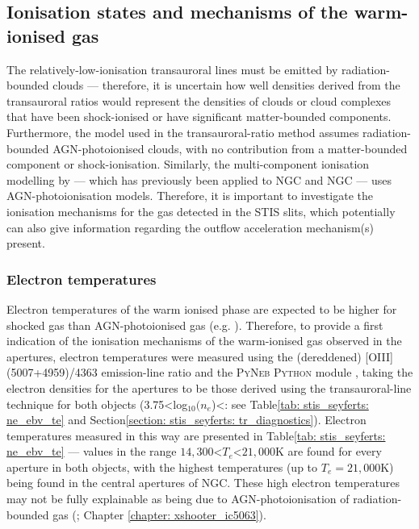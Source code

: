 \subsection{Ionisation states and mechanisms of the warm-ionised gas}
\label{section: stis_seyferts: mechanisms}

The relatively-low-ionisation transauroral lines must be emitted by radiation-bounded clouds --- therefore, it is uncertain how well densities derived from the transauroral ratios would represent the densities of clouds or cloud complexes that have been shock-ionised or have significant matter-bounded components. Furthermore, the model used in the transauroral-ratio method assumes radiation-bounded AGN-photoionised clouds, with no contribution from a matter-bounded component or shock-ionisation. Similarly, the multi-component ionisation modelling by \citet{Revalski2021} --- which has previously been applied to NGC and NGC --- uses AGN-photoionisation models. Therefore, it is important to investigate the ionisation mechanisms for the gas detected in the STIS slits, which potentially can also give information regarding the outflow acceleration mechanism(s) present.

\subsubsection{Electron temperatures}
\label{section: stis_seyferts: electron_temperatures}

Electron temperatures of the warm ionised phase are expected to be higher for shocked gas than AGN-photoionised gas (e.g. \citealt{Fosbury1978, VillarMartin1999}). Therefore, to provide a first indication of the ionisation mechanisms of the warm-ionised gas observed in the apertures, electron temperatures were measured using the (dereddened) [OIII](5007+4959)/4363 emission-line ratio and the \textsc{PyNeb Python} module \citep{Luridiana2015}, taking the electron densities for the apertures to be those derived using the transauroral-line technique for both objects (3.75\;\textless\;log$_{10}(n_e$\;[cm$^{-3}$])\;\textless{}: see Table\;\ref{tab: stis_seyferts: ne_ebv_te} and Section\;\ref{section: stis_seyferts: tr_diagnostics}). Electron temperatures measured in this way are presented in Table\;\ref{tab: stis_seyferts: ne_ebv_te} --- values in the range $14,300$\;\textless\;$T_e$\;\textless\;$21,000$\;K are found for every aperture in both objects, with the highest temperatures (up to $T_e=21,000$\;K) being found in the central apertures of NGC. These high electron temperatures may not be fully explainable as being due to AGN-photoionisation of radiation-bounded gas (\citealt{Fosbury1978, Binette1996, VillarMartin1999}; Chapter \ref{chapter: xshooter_ic5063}).

